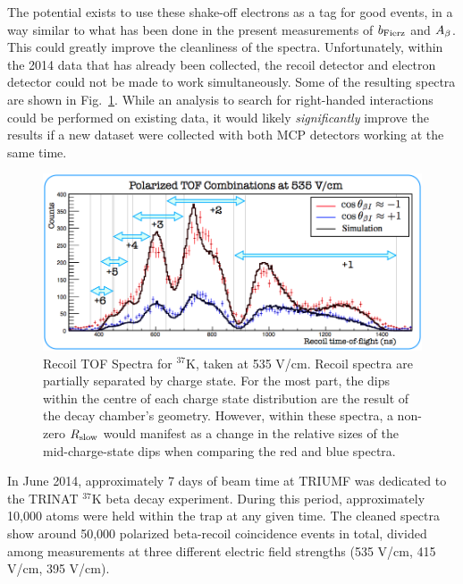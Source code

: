 The potential exists to use these shake-off electrons as a tag for good events, in a way similar to what has been done in the present measurements of $b_{\mathrm{Fierz}}$ and $A_{\beta}$.  This could greatly improve the cleanliness of the spectra.  Unfortunately, within the 2014 data that has already been collected, the recoil detector and electron detector could not be made to work simultaneously.  Some of the resulting spectra are shown in Fig.~\ref{fig:RslowSpectra}.  While an analysis to search for right-handed interactions could be performed on existing data, it would likely \emph{significantly} improve the results if a new dataset were collected with both \ac{MCP} detectors working at the same time. 

\begin{figure}[htb]
	\centering
	\includegraphics[width=.999\linewidth]{Figures/Rslow_tof_squished.png}
	\caption[Recoil TOF Spectra at 535 V/cm]{Recoil TOF Spectra for $^{37}$K, taken at 535 V/cm.  Recoil spectra are partially separated by charge state.  For the most part, the dips within the centre of each charge state distribution are the result of the decay chamber's geometry.  However, within these spectra, a non-zero $R_{\textrm{slow}}$ would manifest as a change in the relative sizes of the mid-charge-state dips when comparing the red and blue spectra.	
	}
	\label{fig:RslowSpectra}
\end{figure}



In June 2014, approximately 7 days of beam time at TRIUMF was dedicated to the TRINAT $^{37}\textrm{K}$ beta decay experiment.  During this period, approximately 10,000 atoms were held within the trap at any given time.  The cleaned spectra show around 50,000 polarized beta-recoil coincidence events in total, divided among measurements at three different electric field strengths (535 V/cm, 415 V/cm, 395 V/cm).

